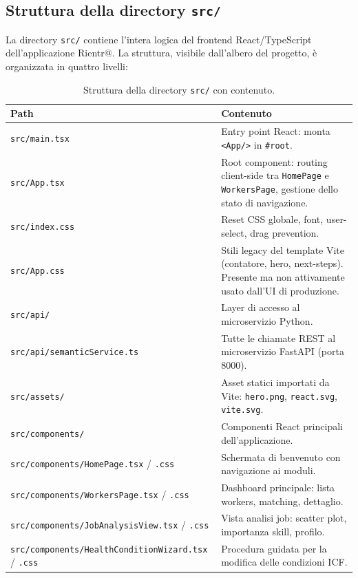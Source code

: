 \documentclass[a4paper,12pt]{article}
\begin{document}
\subsection{Struttura della directory \texttt{src/}}

La directory \texttt{src/} contiene l'intera logica del frontend
React/TypeScript dell'applicazione Rientr@. La struttura, visibile
dall'albero del progetto, \`{e} organizzata in quattro livelli:

\begin{table}[H]
\centering
\caption{Struttura della directory \texttt{src/} con contenuto.}
\begin{tabular}{L{5.5cm} L{7cm}}
\toprule
\textbf{Path} & \textbf{Contenuto} \\
\midrule
\texttt{src/main.tsx} &
  Entry point React: monta \texttt{<App/>} in \texttt{\#root}. \\[3pt]
\texttt{src/App.tsx} &
  Root component: routing client-side tra \texttt{HomePage}
  e \texttt{WorkersPage}, gestione dello stato di navigazione. \\[3pt]
\texttt{src/index.css} &
  Reset CSS globale, font, user-select, drag prevention. \\[3pt]
\texttt{src/App.css} &
  Stili legacy del template Vite (contatore, hero, next-steps).
  Presente ma non attivamente usato dall'UI di produzione. \\[3pt]
\texttt{src/api/} &
  Layer di accesso al microservizio Python. \\[3pt]
\texttt{src/api/\allowbreak{}semanticService.ts} &
  Tutte le chiamate REST al microservizio FastAPI (porta 8000). \\[3pt]
\texttt{src/assets/} &
  Asset statici importati da Vite: \texttt{hero.png},
  \texttt{react.svg}, \texttt{vite.svg}. \\[3pt]
\texttt{src/components/} &
  Componenti React principali dell'applicazione. \\[3pt]
\texttt{src/\allowbreak{}components/\allowbreak{}HomePage.tsx} / \texttt{.css} &
  Schermata di benvenuto con navigazione ai moduli. \\[3pt]
\texttt{src/components/\allowbreak{}WorkersPage.tsx} / \texttt{.css} &
  Dashboard principale: lista workers, matching, dettaglio. \\[3pt]
\texttt{src/\allowbreak{}components/\allowbreak{}JobAnalysis\allowbreak{}View.tsx} / \texttt{.css} &
  Vista analisi job: scatter plot, importanza skill, profilo. \\[3pt]
\texttt{src/\allowbreak{}components/\allowbreak{}HealthCondition\allowbreak{}Wizard.tsx} / \texttt{.css} &
  Procedura guidata per la modifica delle condizioni ICF. \\
\bottomrule
\end{tabular}
\end{table}
\end{document}
